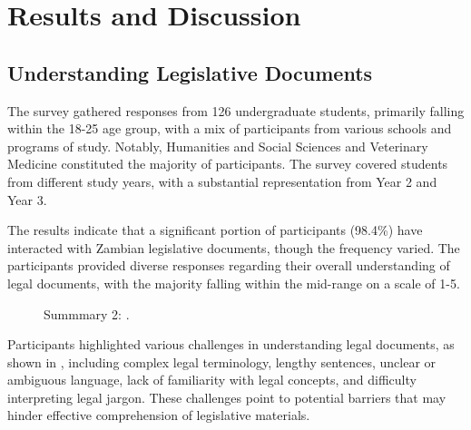 \documentclass[conference]{IEEEtran}
\begin{document}
\section{Results and Discussion}
\label{sec:results_and_discussion}

\subsection{Understanding Legislative Documents}
\label{sec:results_and_discussion:challenges}

The survey gathered responses from 126 undergraduate students, primarily falling within the
18-25 age group, with a mix of participants from various schools and programs of study.
Notably, Humanities and Social Sciences and Veterinary Medicine constituted the majority of
participants. The survey covered students from different study years, with a substantial
representation from Year 2 and Year 3.

The results indicate that a significant portion of participants (98.4\%) have interacted with
Zambian legislative documents, though the frequency varied. The participants provided
diverse responses regarding their overall understanding of legal documents, with the majority
falling within the mid-range on a scale of 1-5.

\begin{figure}%
%
\caption{Summmary 2: .}
\label{fig:results_and_discussion:challenges:challenges}
\end{figure}

Participants highlighted various challenges in understanding legal documents, as shown in , including
complex legal terminology, lengthy sentences, unclear or ambiguous language, lack of
familiarity with legal concepts, and difficulty interpreting legal jargon. These challenges
point to potential barriers that may hinder effective comprehension of legislative materials.
\end{document}

